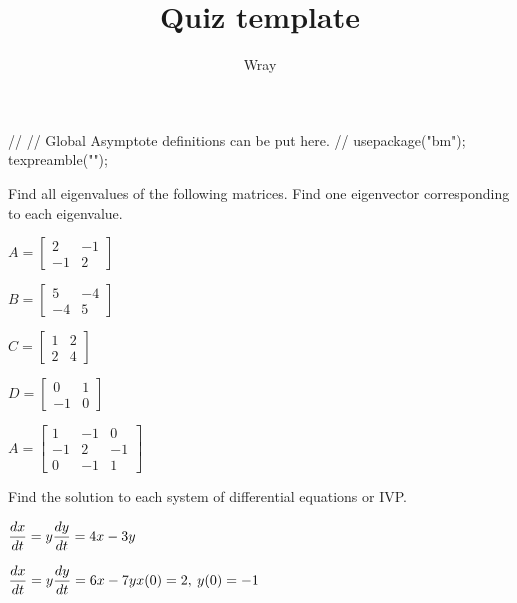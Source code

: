 \documentclass[addpoints, 12pt]{exam}
\title{Quiz template}
\author{Wray}
\begin{document}
\begin{asydef}
//
// Global Asymptote definitions can be put here.
//
usepackage("bm");
texpreamble("\def\V#1{\bm{#1}}");
\end{asydef}



\bigskip
\bigskip
\newline
Find all eigenvalues of the following matrices.  Find one eigenvector corresponding to each eigenvalue.
\begin{questions}

\question
$A =
\left[ \begin{array}{cc}
2 & -1 \\ -1 & 2
\end{array}
\right]$

\question
$B =
\left[ \begin{array}{cc}
5 & -4 \\ -4 & 5
\end{array}
\right]$

\question
$C =
\left[ \begin{array}{cc}
1 & 2 \\ 2 & 4
\end{array}
\right]$

\question
$D =
\left[ \begin{array}{cc}
0 & 1 \\ -1 & 0
\end{array}
\right]$

\question
$A =
\left[ \begin{array}{ccc}
1 & -1 & 0 \\ -1 & 2 & -1 \\ 0 & -1 & 1
\end{array}
\right]$

\end{questions}
\bigskip
Find the solution to each system of differential equations or IVP.

\begin{questions}
\setcounter{question}{5}
\question
$\dfrac{dx}{dt} = y \smallskip \\ \dfrac{dy}{dt} = 4x - 3y$

\question
$\dfrac{dx}{dt} = y \smallskip \\ \dfrac{dy}{dt} = 6x - 7y \smallskip \\ x(0) = 2, \> y(0) = -1$

\end{questions}
\end{document}
